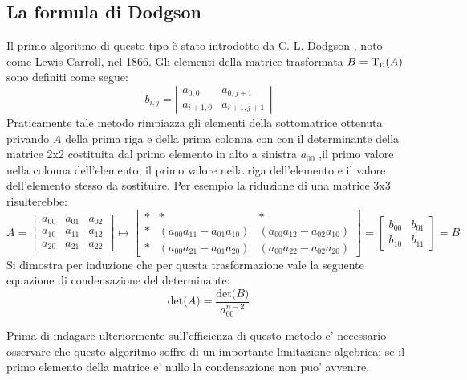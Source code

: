 \documentclass{article}
\begin{document}
\subsection{La formula di Dodgson}
Il primo algoritmo di questo tipo è stato introdotto da C. L. Dodgson \cite{Carroll}, noto come Lewis Carroll, nel 1866.
Gli elementi della matrice trasformata $B = \mbox{T}_{\mbox{\tiny D}}(A)$ sono definiti come segue:
\begin{equation}\label{eq:Dodgson}
b_{i,j} =
\left| \begin{array}{cc} a_{0,0} & a_{0,j+1}  \\ a_{i+1 , 0} & a_{i+1 , j+1}  \end{array} \right| 
\end{equation}
Praticamente tale metodo rimpiazza gli elementi della sottomatrice ottenuta privando $A$ della prima riga e della prima colonna con con il determinante della matrice 2x2 costituita dal primo elemento in alto a sinistra $a_{00}$ ,il primo valore nella colonna dell'elemento, il primo valore nella riga dell'elemento e il valore dell'elemento stesso da sostituire.
Per esempio la riduzione di una matrice 3x3 risulterebbe:
\begin{displaymath}
	A =
	\left[ \begin{array}{ccc} a_{00} & a_{01} & a_{02} \\ a_{10} & a_{11} & a_{12} \\ a_{20} & a_{21} & a_{22}  \end{array} \right] 
	\mapsto
\left[ \begin{array}{ccc} \ast & \ast & \ast  \\ \ast & (a_{00}a_{11} - a_{01}a_{10}) & (a_{00}a_{12} - a_{02}a_{10}) \\ \ast & (a_{00}a_{21} - a_{01}a_{20}) & (a_{00}a_{22} - a_{02}a_{20})  \end{array} \right] 
	=
\left[ \begin{array}{cc} b_{00} & b_{01} \\ b_{10} & b_{11} \end{array} \right]
	=
	B
\end{displaymath}
Si dimostra per induzione che per questa trasformazione vale la seguente  equazione di condensazione del determinante:
\begin{equation}
 \mbox{det}\big(A\big) = \dfrac{\mbox{det}\big(B\big)}{a_{00}^{n-2}}
\end{equation}

Prima di indagare ulteriormente sull'efficienza di questo metodo e' necessario osservare che questo algoritmo soffre di un importante limitazione algebrica: se il primo elemento della matrice e' nullo la condensazione non puo' avvenire.
\end{document}
